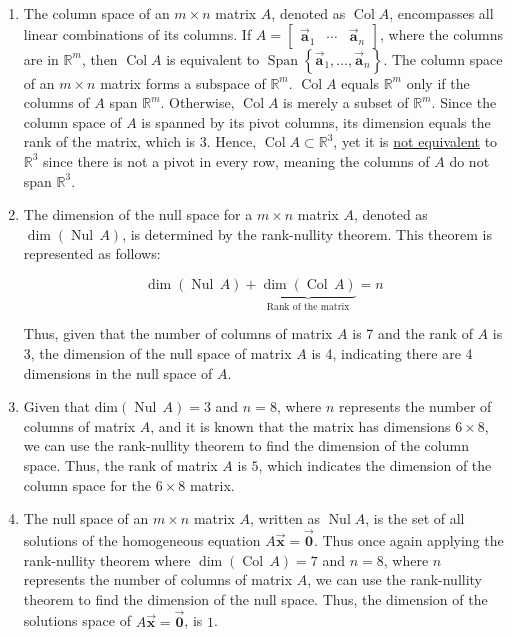 \documentclass[letter,11pt]{article}
\theoremstyle{definition}
\begin{document}
\begin{tcolorbox}[boxrule=1mm, width=(.9\linewidth),before=\hfill,after=\hfill,adjusted title={Problem 1 Solutions}]
    \begin{enumerate}[label = \roman*.]
        \item The column space of an $m\times n$ matrix $A$, denoted as $\operatorname{Col} A$, encompasses all linear combinations of its columns. If $A = \begin{bmatrix} \vec{\boldsymbol{a}}_1 & \cdots &  \vec{\boldsymbol{a}}_n \end{bmatrix}$, where the columns are in $\mathbb{R}^m$, then $\operatorname{Col} A$ is equivalent to $\operatorname{Span} \left\{  \vec{\boldsymbol{a}}_1, \ldots,  \vec{\boldsymbol{a}}_n \right\}$. The column space of an $m \times n$ matrix forms a subspace of $\mathbb{R}^m$. $\operatorname{Col} A$ equals $\mathbb{R}^m$ only if the columns of $A$ span $\mathbb{R}^m$. Otherwise, $\operatorname{Col} A$ is merely a subset of $\mathbb{R}^m$. Since the column space of $A$ is spanned by its pivot columns, its dimension equals the rank of the matrix, which is 3. Hence, $\operatorname{Col} A \subset \mathbb{R}^3$, yet it is \underline{not equivalent} to $\mathbb{R}^3$ since there is not a pivot in every row, meaning the columns of $A$ do not span $\mathbb{R}^3$.
        
        \item The dimension of the null space for a $m \times n$ matrix $A$, denoted as $\operatorname{dim}(\operatorname{Nul} \, A)$, is determined by the rank-nullity theorem. This theorem is represented as follows: 

        $$\operatorname{dim}(\operatorname{Nul} \, A) + \underbrace{\operatorname{dim}(\operatorname{Col} \, A)}_{\text{Rank of the matrix}} = n$$

        Thus, given that the number of columns of matrix \( A \) is 7 and the rank of \( A \) is 3, the dimension of the null space of matrix \( A \) is 4, indicating there are 4 dimensions in the null space of \( A \).

        \item Given that $\text{dim}(\operatorname{Nul} \, A) = 3 $ and $n = 8$, where $n$ represents the number of columns of matrix $A$, and it is known that the matrix has dimensions $6 \times 8$, we can use the rank-nullity theorem to find the dimension of the column space. Thus, the rank of matrix $A$ is $5$, which indicates the dimension of the column space for the $6 \times 8$ matrix.

        \item The null space of an $m\times n$ matrix $A$, written as $\operatorname{Nul} A$, is the set of all solutions of the homogeneous equation $A \vec{\mathrm{\boldsymbol{x}}}=\vec{\boldsymbol{0}}$. Thus once again applying the rank-nullity theorem where $\operatorname{dim}(\operatorname{Col} \, A) = 7$ and $n = 8$, where $n$ represents the number of columns of matrix $A$, we can use the rank-nullity theorem to find the dimension of the null space. Thus, the dimension of the solutions space of $A \vec{\mathrm{\boldsymbol{x}}}=\vec{\boldsymbol{0}}$, is $1$.
    \end{enumerate}
\end{tcolorbox}
\end{document}
